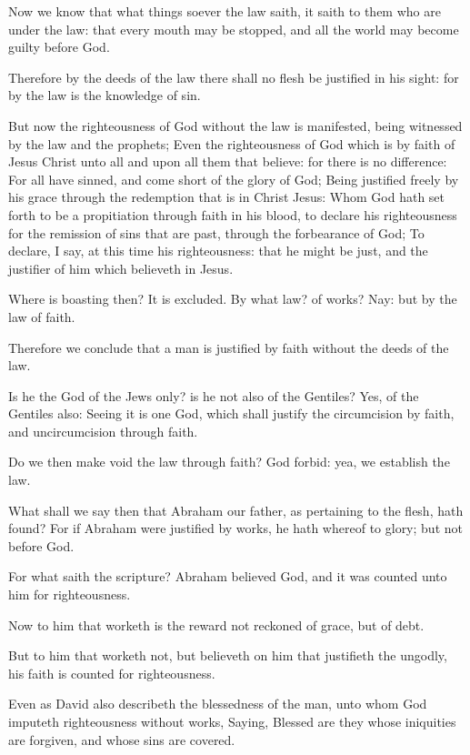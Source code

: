 \Verse Now we know that what things soever the law saith, it saith to them who are under the law: that every mouth may be stopped, and all the world may become guilty before God.

\Verse Therefore by the deeds of the law there shall no flesh be justified in his sight: for by the law is the knowledge of sin.

\Verse But now the righteousness of God without the law is manifested, being witnessed by the law and the prophets; \Verse Even the righteousness of God which is by faith of Jesus Christ unto all and upon all them that believe: for there is no difference: \Verse For all have sinned, and come short of the glory of God; \Verse Being justified freely by his grace through the redemption that is in Christ Jesus: \Verse Whom God hath set forth to be a propitiation through faith in his blood, to declare his righteousness for the remission of sins that are past, through the forbearance of God; \Verse To declare, I say, at this time his righteousness: that he might be just, and the justifier of him which believeth in Jesus.

\Verse Where is boasting then? It is excluded. By what law? of works?  Nay: but by the law of faith.

\Verse Therefore we conclude that a man is justified by faith without the deeds of the law.

\Verse Is he the God of the Jews only? is he not also of the Gentiles?  Yes, of the Gentiles also: \Verse Seeing it is one God, which shall justify the circumcision by faith, and uncircumcision through faith.

\Verse Do we then make void the law through faith? God forbid: yea, we establish the law.


\Chapter
\Verse What shall we say then that Abraham our father, as pertaining to the flesh, hath found?  \Verse For if Abraham were justified by works, he hath whereof to glory; but not before God.

\Verse For what saith the scripture? Abraham believed God, and it was counted unto him for righteousness.

\Verse Now to him that worketh is the reward not reckoned of grace, but of debt.

\Verse But to him that worketh not, but believeth on him that justifieth the ungodly, his faith is counted for righteousness.

\Verse Even as David also describeth the blessedness of the man, unto whom God imputeth righteousness without works, \Verse Saying, Blessed are they whose iniquities are forgiven, and whose sins are covered.

